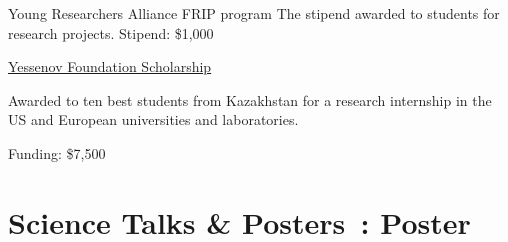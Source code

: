 \documentclass[10pt]{article} %
\begin{document}
\begin{paracol}{1}
	{Young Researchers Alliance FRIP program}
	{The stipend awarded to students for research projects. Stipend: \$1,000}
	
	
	\nonstopmode
	{\href{http://yessenovfoundation.org/en/}{Yessenov Foundation Scholarship}}
	{Awarded to ten best students from Kazakhstan for a research  internship in the US and European universities and laboratories. 
	
	Funding: \$7,500}
	
	



\section{Science Talks \& Posters \footnotesize {\faFileImageO}\,: Poster \phantom{XX.}}





	






\end{paracol}
\end{document}
